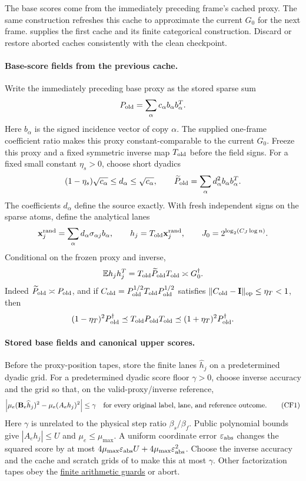 \documentclass[11pt]{article}
\theoremstyle{remark}
\newcommand{\BB}{\mathbf B}
\newcommand{\II}{\mathbf I}
\newcommand{\xxrand}{\mathbf{x}^{\mathrm{rand}}}
\newcommand{\Ex}{\mathbb E}
\newcommand{\norm}[1]{\lVert#1\rVert}
\begin{document}
The base scores come from the immediately preceding frame's cached proxy.
The same construction refreshes this cache to approximate the current $G_0$ for
the next frame.
 supplies the first cache and its finite
categorical construction.
Discard or restore aborted caches consistently with the clean checkpoint.

\paragraph{Base-score fields from the previous cache.}
Write the immediately preceding base proxy as the stored sparse sum
\[
 P_{\rm old}=\sum_{\alpha}c_\alpha b_\alpha b_\alpha^T .
\]
Here $b_\alpha$ is the signed incidence vector of copy $\alpha$.
The supplied one-frame coefficient ratio makes this proxy constant-comparable to
the current $G_0$.
Freeze this proxy and a fixed symmetric inverse map $T_{\rm old}$ before the
field signs.
For a fixed small constant $\eta_s>0$, choose short dyadics
\[
 (1-\eta_s)\sqrt{c_\alpha}\le d_\alpha\le\sqrt{c_\alpha},
 \qquad
 \widetilde P_{\rm old}
       =\sum_\alpha d_\alpha^2b_\alpha b_\alpha^T .
\]
The coefficients $d_\alpha$ define the source exactly.
With fresh independent signs on the sparse atoms, define the analytical lanes
\[
 \xxrand_j=\sum_\alpha d_\alpha \sigma_{\alpha j}b_\alpha,
 \qquad h_j=T_{\rm old}\xxrand_j,
 \qquad J_0=2^{ \log_2(C_J\log n) }.
\]
Conditional on the frozen proxy and inverse,
\[
 \Ex h_jh_j^T
       =T_{\rm old}\widetilde P_{\rm old}T_{\rm old}
       \asymp G_0^\dagger.
\]
Indeed $\widetilde P_{\rm old}\asymp P_{\rm old}$, and if $C_{\rm old}=P_{\rm
old}^{1/2}T_{\rm old}P_{\rm old}^{1/2}$ satisfies $\norm{C_{\rm old}-\II}_{\rm
op}\le\eta_T<1$, then
\[
 (1-\eta_T)^2P_{\rm old}^\dagger
 \preceq T_{\rm old}P_{\rm old}T_{\rm old}
 \preceq(1+\eta_T)^2P_{\rm old}^\dagger .
\]

\paragraph{Stored base fields and canonical upper scores.}
Before the proxy-position tapes, store the finite lanes $\widehat h_j$ on a
predetermined dyadic grid.
For a predetermined dyadic score floor $\gamma>0$, choose inverse accuracy and
the grid so that, on the valid-proxy/inverse reference,
\[
 \left|
 \mu_e(\BB_e\widehat h_j)^2-\mu_e(A_eh_j)^2
 \right|\le\gamma
 \quad\hbox{for every original label, lane, and reference outcome}.
\tag{CF1}\label{eq:ram27-base-field-rounding}
\]
Here $\gamma$ is unrelated to the physical step ratio $\beta_s/\beta_f$.
Public polynomial bounds give $|A_eh_j|\le U$ and $\mu_e\le\mu_{\max}$.
A uniform coordinate error $\varepsilon_{\rm abs}$ changes the squared score by
at most $4\mu_{\max}\varepsilon_{\rm abs}U+ 4\mu_{\max}\varepsilon_{\rm abs}^2$.
Choose the inverse accuracy and the cache and scratch grids of
 to make this at most $\gamma$.
Other factorization tapes obey the \hyperref[par:ram30-finite-arithmetic]{finite
arithmetic guards} or abort.
\end{document}
